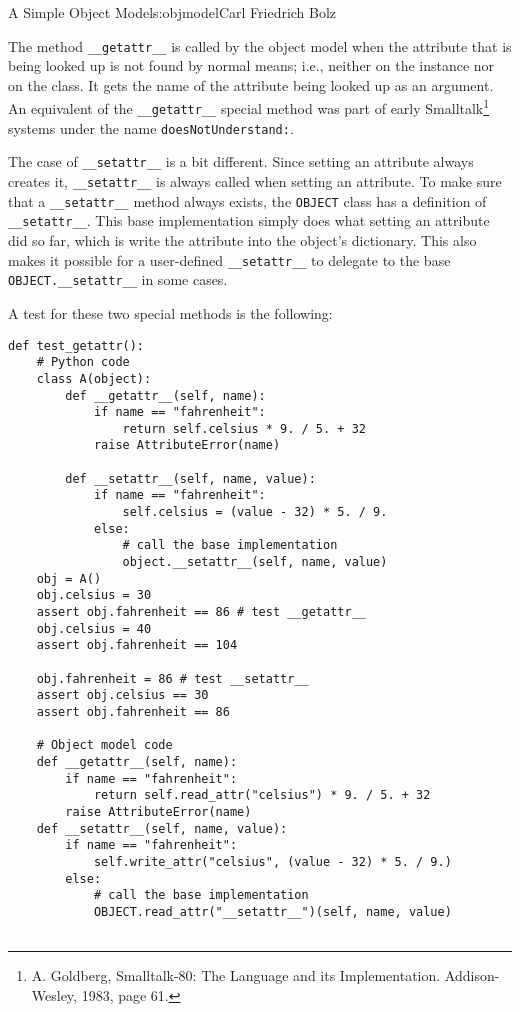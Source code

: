 \begin{aosachapter}{A Simple Object Model}{s:objmodel}{Carl Friedrich Bolz}
\label{customizing-reading-and-writing-and-attribute}

The method \texttt{\_\_getattr\_\_} is called by the object model when
the attribute that is being looked up is not found by normal means;
i.e., neither on the instance nor on the class. It gets the name of the
attribute being looked up as an argument. An equivalent of the
\texttt{\_\_getattr\_\_} special method was part of early
Smalltalk\footnote{A. Goldberg, Smalltalk-80: The Language and its
  Implementation. Addison-Wesley, 1983, page 61.} systems under the name
\texttt{doesNotUnderstand:}.

The case of \texttt{\_\_setattr\_\_} is a bit different. Since setting
an attribute always creates it, \texttt{\_\_setattr\_\_} is always
called when setting an attribute. To make sure that a
\texttt{\_\_setattr\_\_} method always exists, the \texttt{OBJECT} class
has a definition of \texttt{\_\_setattr\_\_}. This base implementation
simply does what setting an attribute did so far, which is write the
attribute into the object's dictionary. This also makes it possible for
a user-defined \texttt{\_\_setattr\_\_} to delegate to the base
\texttt{OBJECT.\_\_setattr\_\_} in some cases.

A test for these two special methods is the following:

\begin{verbatim}
def test_getattr():
    # Python code
    class A(object):
        def __getattr__(self, name):
            if name == "fahrenheit":
                return self.celsius * 9. / 5. + 32
            raise AttributeError(name)

        def __setattr__(self, name, value):
            if name == "fahrenheit":
                self.celsius = (value - 32) * 5. / 9.
            else:
                # call the base implementation
                object.__setattr__(self, name, value)
    obj = A()
    obj.celsius = 30
    assert obj.fahrenheit == 86 # test __getattr__
    obj.celsius = 40
    assert obj.fahrenheit == 104

    obj.fahrenheit = 86 # test __setattr__
    assert obj.celsius == 30
    assert obj.fahrenheit == 86

    # Object model code
    def __getattr__(self, name):
        if name == "fahrenheit":
            return self.read_attr("celsius") * 9. / 5. + 32
        raise AttributeError(name)
    def __setattr__(self, name, value):
        if name == "fahrenheit":
            self.write_attr("celsius", (value - 32) * 5. / 9.)
        else:
            # call the base implementation
            OBJECT.read_attr("__setattr__")(self, name, value)


\end{verbatim}
\end{aosachapter}
